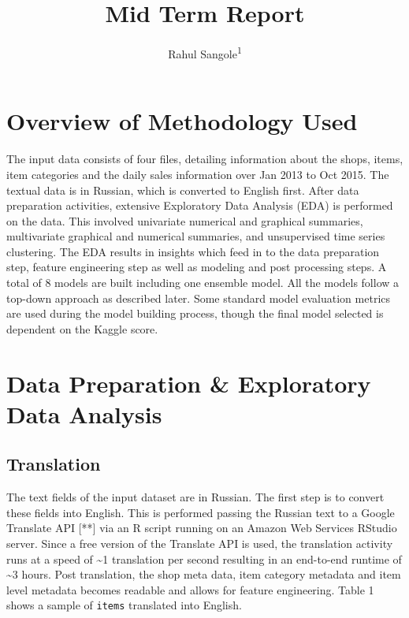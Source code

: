\documentclass[floatsintext,man]{apa6}
\title{Mid Term Report}
\author{Rahul Sangole\textsuperscript{1}}
\affiliation{
    \vspace{0.5cm}
          \textsuperscript{1} Northwestern University  }
\theoremstyle{definition}
\theoremstyle{definition}
\theoremstyle{definition}
\theoremstyle{remark}
\begin{document}
\maketitle

\setcounter{secnumdepth}{0}



\section{Overview of Methodology
Used}\label{overview-of-methodology-used}

The input data consists of four files, detailing information about the
shops, items, item categories and the daily sales information over Jan
2013 to Oct 2015. The textual data is in Russian, which is converted to
English first. After data preparation activities, extensive Exploratory
Data Analysis (EDA) is performed on the data. This involved univariate
numerical and graphical summaries, multivariate graphical and numerical
summaries, and unsupervised time series clustering. The EDA results in
insights which feed in to the data preparation step, feature engineering
step as well as modeling and post processing steps. A total of 8 models
are built including one ensemble model. All the models follow a top-down
approach as described later. Some standard model evaluation metrics are
used during the model building process, though the final model selected
is dependent on the Kaggle score.

\section{Data Preparation \& Exploratory Data
Analysis}\label{data-preparation-exploratory-data-analysis}

\subsection{Translation}\label{translation}

The text fields of the input dataset are in Russian. The first step is
to convert these fields into English. This is performed passing the
Russian text to a Google Translate API {[}**{]} via an R script running
on an Amazon Web Services RStudio server. Since a free version of the
Translate API is used, the translation activity runs at a speed of
\textasciitilde{}1 translation per second resulting in an end-to-end
runtime of \textasciitilde{}3 hours. Post translation, the shop meta
data, item category metadata and item level metadata becomes readable
and allows for feature engineering. Table 1 shows a sample of
\texttt{items} translated into English.
\end{document}
